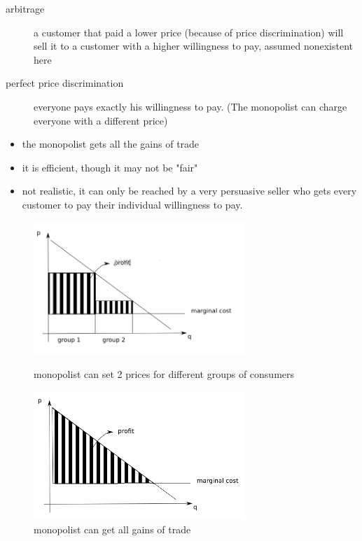 \documentclass[12pt, a4paper, titlepage]{extarticle}
\begin{document}
	\begin{description}
	\item[arbitrage] a customer that paid a lower price (because of price discrimination) will sell it to a customer with a higher willingness to pay, assumed nonexistent here
	\item[perfect price discrimination] everyone pays exactly his willingness to pay. (The monopolist can charge everyone with a different price)
	\end{description}
	\begin{itemize}
	\item the monopolist gets all the gains of trade
	\item it is efficient, though it may not be "fair"
	\item not realistic, it can only be reached by a very persuasive seller who gets every customer to pay their individual willingness to pay.
	\end{itemize}
	\begin{figure}[htp]
	\centering
	    \includegraphics[width=8cm]{monopoly2prices.png}
	    \caption{monopolist can set 2 prices for different groups of consumers\label{fig:monopoly2prises}}
	\includegraphics[width=8cm]{perfect_price_discrimination.png}
	    \caption{monopolist can get all gains of trade\label{fig:monopoly_perfect_price_discrimination}}
	\end{figure}
   
	    
\end{document}
